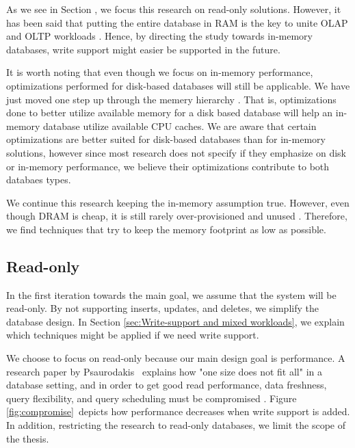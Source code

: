 As we see in Section \cite{sub:Read-Only}, we focus this research on read-only solutions. However, it has been said that putting the entire database in RAM is the key to unite OLAP and OLTP workloads \cite{Faust2015-ke}. Hence, by directing the study towards in-memory databases, write support might easier be supported in the future.

It is worth noting that even though we focus on in-memory performance, optimizations performed for disk-based databases will still be applicable. We have just moved one step up through the memery hierarchy \cite{Boncz2002-yj}. That is, optimizations done to better utilize available memory for a disk based database will help an in-memory database utilize available CPU caches. We are aware that certain optimizations are better suited for disk-based databases than for in-memory solutions, however since most research does not specify if they emphasize on disk or in-memory performance, we believe their optimizations contribute to both databaes types. 

We continue this research keeping the in-memory assumption true. However, even though DRAM is cheap, it is still rarely over-provisioned and unused \cite{Barber2014-ey}. Therefore, we find techniques that try to keep the memory footprint as low as possible.

\subsection{Read-only}
\label{sub:Read-only}
In the first iteration towards the main goal, we assume that the system will be read-only. By not supporting inserts, updates, and deletes, we simplify the database design. In Section \ref{sec:Write-support and mixed workloads}, we explain which techniques might be applied if we need write support.

We choose to focus on read-only because our main design goal is performance. A research paper by Psaurodakis \ea~explains how "one size does not fit all" in a database setting, and in order to get good read performance, data freshness, query flexibility, and query scheduling must be compromised \cite{Psaroudakis2014-ma}. Figure \ref{fig:compromise}~depicts how performance decreases when write support is added. In addition, restricting the research to read-only databases, we limit the scope of the thesis. 

